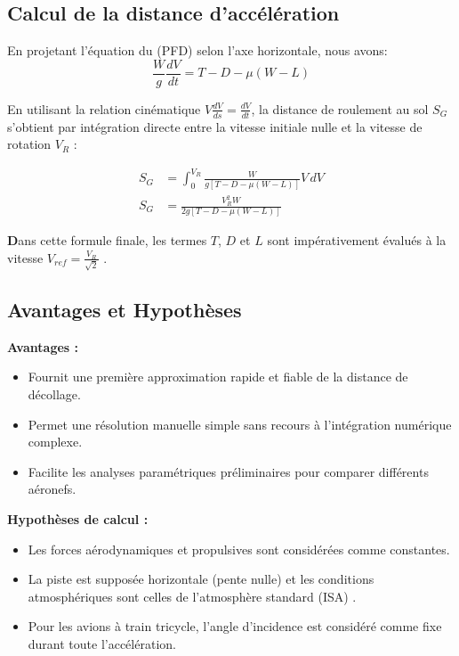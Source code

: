 		\vspace*{1cm}
			
			\subsection{Calcul de la distance d'accélération}
				En projetant l’équation du (PFD) selon l'axe horizontale, nous avons:
				\[ \frac{W}{g} \frac{dV}{dt} = T - D - \mu(W - L) \]
				
				En utilisant la relation cinématique $V \frac{dV}{ds} = \frac{dV}{dt}$, la distance de roulement
				 au sol $S_G$ s'obtient par intégration directe entre la vitesse initiale nulle et la vitesse de rotation $V_R$  :
				
				\begin{align*}
					S_G &= \int_{0}^{V_R} \frac{W}{g[T - D - \mu(W - L)]} V \, dV \\
					S_G &= \frac{V_R^2 W}{2g [T - D - \mu(W - L)]}
				\end{align*}
				
				\textbf Dans cette formule finale, les termes $T$, $D$ et $L$ sont impérativement évalués à la vitesse $V_{ref} = \frac{V_R}{\sqrt{2}}$ .
	\vspace*{1cm}
			\subsection{Avantages et Hypothèses}
				\textbf{Avantages :}
				\begin{itemize}
					\item Fournit une première approximation rapide et fiable de la distance de décollage.
					\item Permet une résolution manuelle simple sans recours à l'intégration numérique complexe.
					\item Facilite les analyses paramétriques préliminaires pour comparer différents aéronefs.
				\end{itemize}
				
				\textbf{Hypothèses de calcul :}
				\begin{itemize}
					\item Les forces aérodynamiques et propulsives sont considérées comme constantes.
					\item La piste est supposée horizontale (pente nulle) et les conditions atmosphériques sont celles de l'atmosphère standard (ISA) .
					\item Pour les avions à train tricycle, l'angle d'incidence est considéré comme fixe durant toute l'accélération.
					\end{itemize}
				

